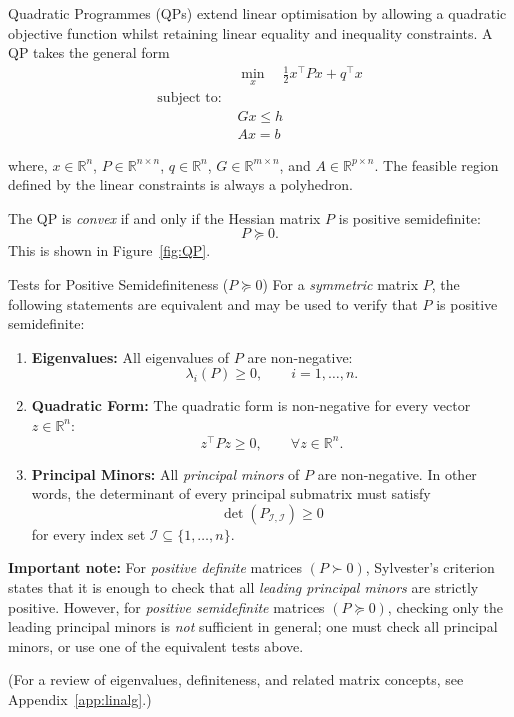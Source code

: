 Quadratic Programmes (QPs) extend linear optimisation by allowing a quadratic objective function whilst retaining linear equality and inequality constraints.
A QP takes the general form
\begin{align*}
	&\min_{x} \quad \frac{1}{2} x^{\top} P x + q^{\top} x \\ 
	 \text{subject to: } & \\
	 & Gx \le h \\ 
	 & Ax = b 
\end{align*}

where, $x\in \mathbb R^n$, $P \in \mathbb{R}^{n \times n}$, $q \in \mathbb{R}^n$, $G \in
\mathbb{R}^{m \times n}$, and $A \in \mathbb{R}^{p \times n}$.  
The feasible region defined by the linear constraints is always a polyhedron.

The QP is \emph{convex} if and only if the Hessian matrix $P$ is
positive semidefinite:
\[
P \succeq 0 .
\]
This is shown in Figure~\ref{fig:QP}.

\begin{notebox}{Tests for Positive Semidefiniteness ($P \succeq 0$)}
	For a \emph{symmetric} matrix \(P\), the following statements are equivalent and may be used to verify that \(P\) is positive semidefinite:
	
	\begin{enumerate}
		\item \textbf{Eigenvalues:} All eigenvalues of \(P\) are non-negative:
		\[
		\lambda_i(P) \ge 0, \qquad i=1,\dots,n.
		\]
		
		\item \textbf{Quadratic Form:} The quadratic form is non-negative for every vector \(z \in \mathbb{R}^n\):
		\[
		z^\top P z \ge 0, \qquad \forall z \in \mathbb{R}^n.
		\]
		
		\item \textbf{Principal Minors:} All \emph{principal minors} of \(P\) are non-negative.
		In other words, the determinant of every principal submatrix must satisfy
		\[
		\det(P_{\mathcal I,\mathcal I}) \ge 0
		\]
		for every index set \(\mathcal I \subseteq \{1,\dots,n\}\).
	\end{enumerate}
	
	\textbf{Important note:}  
	For \emph{positive definite} matrices \((P \succ 0)\), Sylvester's criterion states that it is enough to check that all \emph{leading principal minors} are strictly positive. However, for \emph{positive semidefinite} matrices \((P \succeq 0)\), checking only the leading principal minors is \emph{not} sufficient in general; one must check all principal minors, or use one of the equivalent tests above.

	(For a review of eigenvalues, definiteness, and related matrix concepts, see Appendix~\ref{app:linalg}.)
\end{notebox}

